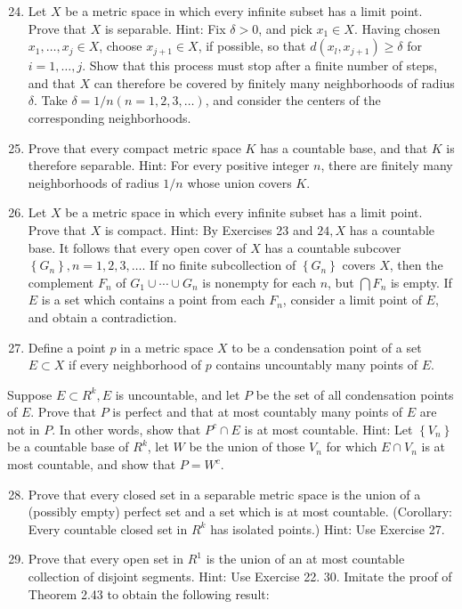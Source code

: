 \documentclass[10pt]{article}
\begin{document}
\begin{enumerate}
  \setcounter{enumi}{23}
  \item Let $X$ be a metric space in which every infinite subset has a limit point. Prove that $X$ is separable. Hint: Fix $\delta>0$, and pick $x_{1} \in X$. Having chosen $x_{1}, \ldots, x_{j} \in X$, choose $x_{j+1} \in X$, if possible, so that $d\left(x_{l}, x_{j+1}\right) \geq \delta$ for $i=1, \ldots, j$. Show that this process must stop after a finite number of steps, and that $X$ can therefore be covered by finitely many neighborhoods of radius $\delta$. Take $\delta=1 / n(n=1,2,3, \ldots)$, and consider the centers of the corresponding neighborhoods.

  \item Prove that every compact metric space $K$ has a countable base, and that $K$ is therefore separable. Hint: For every positive integer $n$, there are finitely many neighborhoods of radius $1 / n$ whose union covers $K$.

  \item Let $X$ be a metric space in which every infinite subset has a limit point. Prove that $X$ is compact. Hint: By Exercises 23 and $24, X$ has a countable base. It follows that every open cover of $X$ has a countable subcover $\left\{G_{n}\right\}, n=1,2,3, \ldots$. If no finite subcollection of $\left\{G_{n}\right\}$ covers $X$, then the complement $F_{n}$ of $G_{1} \cup \cdots \cup G_{n}$ is nonempty for each $n$, but $\bigcap F_{n}$ is empty. If $E$ is a set which contains a point from each $F_{n}$, consider a limit point of $E$, and obtain a contradiction.

  \item Define a point $p$ in a metric space $X$ to be a condensation point of a set $E \subset X$ if every neighborhood of $p$ contains uncountably many points of $E$.

\end{enumerate}

Suppose $E \subset R^{k}, E$ is uncountable, and let $P$ be the set of all condensation points of $E$. Prove that $P$ is perfect and that at most countably many points of $E$ are not in $P$. In other words, show that $P^{c} \cap E$ is at most countable. Hint: Let $\left\{V_{n}\right\}$ be a countable base of $R^{k}$, let $W$ be the union of those $V_{n}$ for which $E \cap V_{n}$ is at most countable, and show that $P=W^{c}$.

\begin{enumerate}
  \setcounter{enumi}{27}
  \item Prove that every closed set in a separable metric space is the union of a (possibly empty) perfect set and a set which is at most countable. (Corollary: Every countable closed set in $R^{k}$ has isolated points.) Hint: Use Exercise 27.

  \item Prove that every open set in $R^{1}$ is the union of an at most countable collection of disjoint segments. Hint: Use Exercise 22. 30. Imitate the proof of Theorem 2.43 to obtain the following result:

\end{enumerate}
\end{document}
